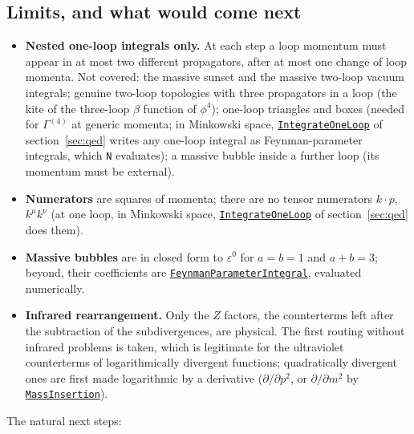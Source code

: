 \documentclass[11pt,a4paper]{article}
\newcommand{\pkg}[1]{\texttt{#1}}
\newcommand{\fnref}[1]{\hyperref[fn:#1]{\pkg{#1}}}
\begin{document}
\subsection{Limits, and what would come next}

\begin{itemize}
\item \textbf{Nested one-loop integrals only.} At each step a loop momentum must appear in at most two different
  propagators, after at most one change of loop momenta. Not covered: the massive sunset and the massive two-loop vacuum
  integrals; genuine two-loop topologies with three propagators in a loop (the kite of the three-loop $\beta$ function of
  $\phi^4$); one-loop triangles and boxes (needed for $\Gamma^{(4)}$ at generic momenta; in Minkowski space,
  \fnref{IntegrateOneLoop} of section~\ref{sec:qed} writes any one-loop integral as Feynman-parameter integrals, which
  \pkg{N} evaluates); a massive bubble inside a further
  loop (its momentum must be external).
\item \textbf{Numerators} are squares of momenta; there are no tensor numerators $k\cdot p$, $k^\mu k^\nu$ (at one loop, in
  Minkowski space, \fnref{IntegrateOneLoop} of section~\ref{sec:qed} does them).
\item \textbf{Massive bubbles} are in closed form to $\varepsilon^0$ for $a=b=1$ and $a+b=3$; beyond, their coefficients are
  \fnref{FeynmanParameterIntegral}, evaluated numerically.
\item \textbf{Infrared rearrangement.} Only the $Z$ factors, the counterterms left after the subtraction of the
  subdivergences, are physical. The first routing without infrared problems is taken, which is legitimate for the
  ultraviolet counterterms of logarithmically divergent functions; quadratically divergent ones are first made
  logarithmic by a derivative ($\partial/\partial p^2$, or $\partial/\partial m^2$ by \fnref{MassInsertion}).
\end{itemize}
The natural next steps:
\end{document}
